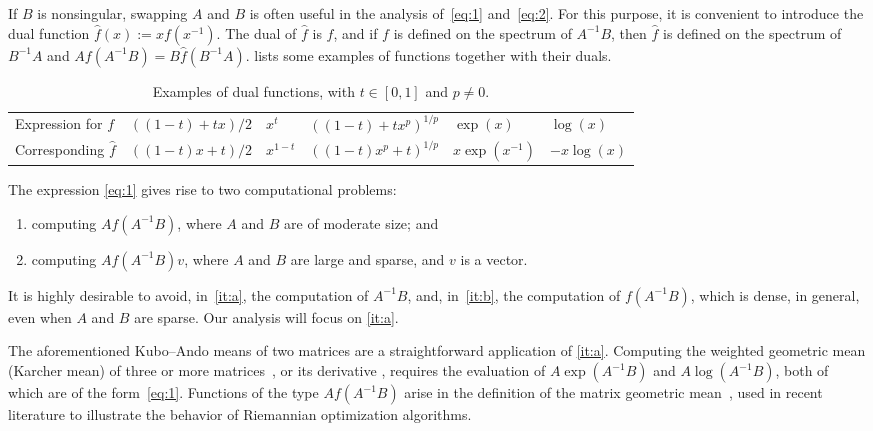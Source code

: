 \documentclass[DIV=14]{scrartcl}
\theoremstyle{thmstyletwo}
\theoremstyle{definition}
\numberwithin{equation}{section}
\newcommand{\deq}{\ensuremath{:=}}
\begin{document}
If $B$ is nonsingular, swapping $A$ and $B$ is often useful in the analysis of~\eqref{eq:1} and~\eqref{eq:2}. For this purpose, it is convenient to introduce the dual function $\widehat f(x) \deq{} xf(x^{-1})$.
The dual of $\widehat f$ is $f$, and if $f$ is defined on the spectrum of $A^{-1}B$, then $\widehat f$ is defined on the spectrum of $B^{-1}A$ and $Af(A^{-1}B)=B\widehat f(B^{-1}A)$.
 lists some examples of functions together with their duals.

\begin{table}[t]
\centering
\caption{Examples of dual functions,
with $t\in[0,1]$ and $p\ne 0$.}\label{tab:1}
\begin{tabularx}{\textwidth}
{X
>{\centering\arraybackslash}p{3cm}
>{\centering\arraybackslash}p{0.8cm}
>{\centering\arraybackslash}p{3cm}
>{\centering\arraybackslash}p{1.5cm}
>{\centering\arraybackslash}p{1.5cm}
}
\toprule
Expression for $f$ & $((1-t)+tx)/2$ & $x^t$ & $((1-t)+tx^p)^{1/p}$ & $\exp(x)$ & $\log(x)$ \\
Corresponding $\widehat f$ & $((1-t)x+t)/2$ & $x^{1-t}$ & $((1-t)x^p+t)^{1/p}$ & $x\exp(x^{-1})$ & $-x\log(x)$ \\
\bottomrule
\end{tabularx}
\end{table}

The expression \eqref{eq:1} gives rise to two computational problems:
\begin{enumerate}[label=P\arabic*., ref=P\arabic*, leftmargin=23pt]
\item computing $Af(A^{-1}B)$, where $A$ and $B$ are of moderate size; and\label{it:a}
\item computing $Af(A^{-1}B)v$, where $A$ and $B$ are large and sparse, and $v$ is a vector.\label{it:b}
\end{enumerate}
It is highly desirable to avoid, in~\ref{it:a}, the computation of $A^{-1}B$, and, in~\ref{it:b}, the computation of $f(A^{-1}B)$, which is dense, in general, even when $A$ and $B$ are sparse.
Our analysis will focus on \ref{it:a}.

The aforementioned Kubo--Ando means of two matrices are a straightforward application of \ref{it:a}.
Computing the weighted geometric mean (Karcher mean) of three or more matrices~\cite{bi13,ip18,q03}, or its derivative \cite{1}, requires the evaluation of $A\exp(A^{-1}B)$ and $A\log(A^{-1}B)$, both of which are of the form~\eqref{eq:1}. Functions of the type $Af(A^{-1}B)$ arise in the definition of the matrix geometric mean~\cite{q01,tsm21,q04,q05}, used in recent literature to illustrate the behavior of Riemannian optimization algorithms.
\end{document}
